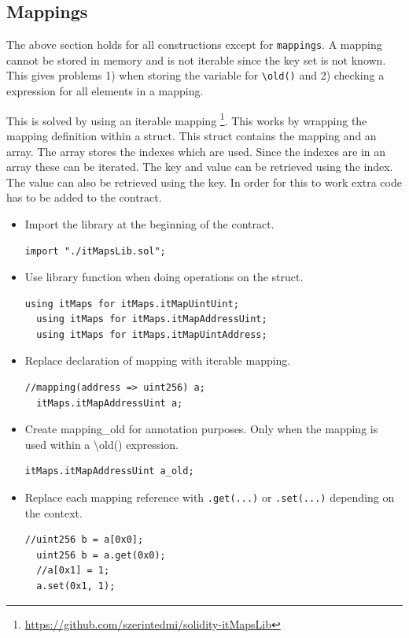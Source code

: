 \documentclass[a4paper]{article}
\begin{document}
\subsection{Mappings}
The above section holds for all constructions except for \texttt{mappings}. A mapping cannot be stored in memory and is not iterable since the key set is not known. This gives problems 1) when storing the variable for \texttt{\textbackslash old()} and 2) checking a expression for all elements in a mapping. \par
This is solved by using an iterable mapping \footnote{\url{https://github.com/szerintedmi/solidity-itMapsLib}}. This works by wrapping the mapping definition within a struct. This struct contains the mapping and an array. The array stores the indexes which are used. Since the indexes are in an array these can be iterated. The key and value can be retrieved using the index. The value can also be retrieved using the key. In order for this to work extra code has to be added to the contract.
\begin{itemize}
  \item Import the library at the beginning of the contract.
  \begin{lstlisting}[breaklines=true, language=Solidity ]
  import "./itMapsLib.sol";
  \end{lstlisting}
  \item Use library function when doing operations on the struct.
  \begin{lstlisting}[breaklines=true, language=Solidity ]
  using itMaps for itMaps.itMapUintUint;
  using itMaps for itMaps.itMapAddressUint;
  using itMaps for itMaps.itMapUintAddress;
  \end{lstlisting}
  \item Replace declaration of mapping with iterable mapping.
  \begin{lstlisting}[breaklines=true, language=Solidity ]
  //mapping(address => uint256) a;
  itMaps.itMapAddressUint a; 
  \end{lstlisting}
  \item Create mapping\_old for annotation purposes. Only when the mapping is used within a \textbackslash old() expression.
  \begin{lstlisting}[breaklines=true, language=Solidity ]
  itMaps.itMapAddressUint a_old; 
  \end{lstlisting}
  \item Replace each mapping reference with \texttt{.get(...)} or \texttt{.set(...)} depending on the context.
  \begin{lstlisting}[breaklines=true, language=Solidity ]
  //uint256 b = a[0x0];
  uint256 b = a.get(0x0);
  //a[0x1] = 1;
  a.set(0x1, 1); 
  \end{lstlisting}
\end{itemize}
\end{document}
